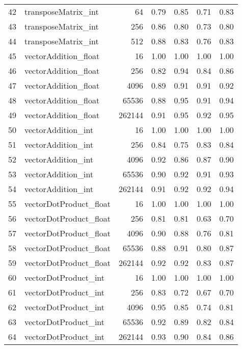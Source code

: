 \begin{tabular}{rlrrrrr}
 42 & transposeMatrix\_int    &     64 &   0.79 &     0.85 &   0.71 &     0.83 \\
 43 & transposeMatrix\_int    &    256 &   0.86 &     0.80 &   0.73 &     0.80 \\
 44 & transposeMatrix\_int    &    512 &   0.88 &     0.83 &   0.76 &     0.83 \\
 45 & vectorAddition\_float   &     16 &   1.00 &     1.00 &   1.00 &     1.00 \\
 46 & vectorAddition\_float   &    256 &   0.82 &     0.94 &   0.84 &     0.86 \\
 47 & vectorAddition\_float   &   4096 &   0.89 &     0.91 &   0.91 &     0.92 \\
 48 & vectorAddition\_float   &  65536 &   0.88 &     0.95 &   0.91 &     0.94 \\
 49 & vectorAddition\_float   & 262144 &   0.91 &     0.95 &   0.92 &     0.95 \\
 50 & vectorAddition\_int     &     16 &   1.00 &     1.00 &   1.00 &     1.00 \\
 51 & vectorAddition\_int     &    256 &   0.84 &     0.75 &   0.83 &     0.84 \\
 52 & vectorAddition\_int     &   4096 &   0.92 &     0.86 &   0.87 &     0.90 \\
 53 & vectorAddition\_int     &  65536 &   0.90 &     0.92 &   0.91 &     0.93 \\
 54 & vectorAddition\_int     & 262144 &   0.91 &     0.92 &   0.92 &     0.94 \\
 55 & vectorDotProduct\_float &     16 &   1.00 &     1.00 &   1.00 &     1.00 \\
 56 & vectorDotProduct\_float &    256 &   0.81 &     0.81 &   0.63 &     0.70 \\
 57 & vectorDotProduct\_float &   4096 &   0.90 &     0.88 &   0.76 &     0.81 \\
 58 & vectorDotProduct\_float &  65536 &   0.88 &     0.91 &   0.80 &     0.87 \\
 59 & vectorDotProduct\_float & 262144 &   0.92 &     0.92 &   0.83 &     0.87 \\
 60 & vectorDotProduct\_int   &     16 &   1.00 &     1.00 &   1.00 &     1.00 \\
 61 & vectorDotProduct\_int   &    256 &   0.83 &     0.72 &   0.67 &     0.70 \\
 62 & vectorDotProduct\_int   &   4096 &   0.95 &     0.85 &   0.74 &     0.81 \\
 63 & vectorDotProduct\_int   &  65536 &   0.92 &     0.89 &   0.82 &     0.84 \\
 64 & vectorDotProduct\_int   & 262144 &   0.93 &     0.90 &   0.84 &     0.86 \\
\bottomrule
\end{tabular}
